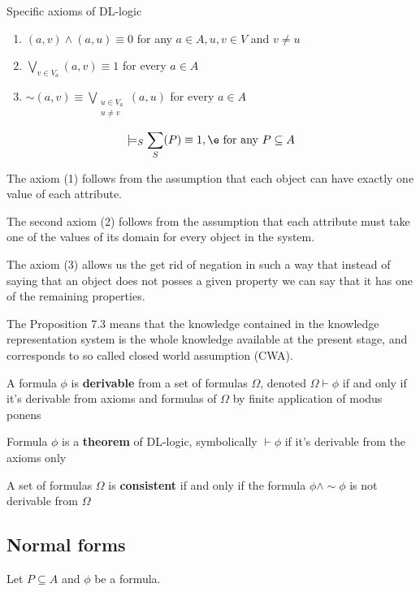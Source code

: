\documentclass[11pt]{article}
\begin{document}
Specific axioms of DL-logic
\begin{enumerate}
\item \((a,v)\wedge(a,u)\equiv 0\) for any \(a\in A,u,v\in V\) and \(v\neq u\)
\item \(\displaystyle\bigvee_{v\in V_a}(a,v)\equiv 1\) for every \(a\in A\)
\item \(\sim(a,v)\equiv\displaystyle\bigvee_{\substack{u\in V_a\\ u\neq v}}(a,u)\) for every
\(a\in A\)
\end{enumerate}


\begin{proposition}[7.3]
\begin{equation*}
\models_S \displaystyle\sum_{S}(P)\equiv 1,\e\text{ for any } 
P\subseteq A
\end{equation*}
\end{proposition}

The axiom (1) follows from the assumption that each object can have exactly
one value of each attribute.

The second axiom (2) follows from the assumption that each attribute must
take one of the values of its domain for every object in the system. 

The axiom (3) allows us the get rid of negation in such a way that instead of
saying that an object does not posses a given property we can say that it has
one of the remaining properties.

The Proposition 7.3 means that the knowledge contained in the knowledge
representation system is the whole knowledge available at the present stage,
and corresponds to so called closed world assumption (CWA).


A formula \(\phi\) is \textbf{derivable} from a set of formulas \(\Omega\), denoted \(\Omega\vdash\phi\) if
and only if it's derivable from axioms and formulas of \(\Omega\) by finite
application of modus ponens

Formula \(\phi\) is a \textbf{theorem} of DL-logic, symbolically \(\vdash \phi\) if it's derivable
from the axioms only


A set of formulas \(\Omega\) is \textbf{consistent} if and only if the formula \(\phi\wedge\sim\phi\) is not
derivable from \(\Omega\)
\subsection{Normal forms}
\label{sec:org8c3c535}
Let \(P\subseteq A\) and \(\phi\) be a formula.
\end{document}
